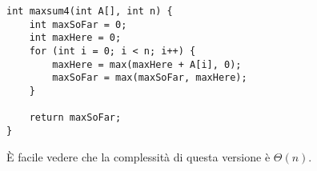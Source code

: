 \begin{code}
\begin{verbatim}
int maxsum4(int A[], int n) {
	int maxSoFar = 0;
	int maxHere = 0;
	for (int i = 0; i < n; i++) {
		maxHere = max(maxHere + A[i], 0);
		maxSoFar = max(maxSoFar, maxHere);
	}

	return maxSoFar;
}
\end{verbatim}
\end{code}

\`{E} facile vedere che la complessità di questa versione è \(\Theta(n)\).

\ifsubfile

\fi
